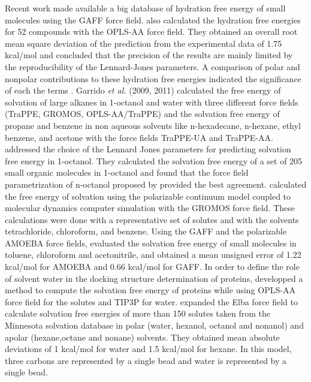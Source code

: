 Recent work \cite{PMID:24928188,mobley2017} made available a big database of hydration free energy of small molecules using the GAFF force field.  also calculated the hydration free energies for 52 compounds with the OPLS-AA force field. They obtained an overall root mean square deviation of the prediction from the experimental data of 1.75 kcal/mol and concluded that the precision of the results are mainly limited by the reproducibility of the Lennard-Jones parameters. A comparison of polar and nonpolar contributions to these hydration free energies indicated the significance of each the terms  \cite{izairi2017}. Garrido \textit{et al.} (2009, 2011) calculated the free energy of solvation of large alkanes in 1-octanol and water with three different force fields (TraPPE, GROMOS, OPLS-AA/TraPPE) and the solvation free energy of propane and benzene in non aqueous solvents like n-hexadecane, n-hexane, ethyl benzene, and acetone  with the force fields TraPPE-UA and TraPPE-AA.  addressed the choice of the Lennard Jones parameters for predicting solvation free energy in 1-octanol. They calculated the solvation free energy of a set of 205 small organic molecules in 1-octanol and found that the force field parametrization of n-octanol proposed by  provided the best agreement.  calculated the free energy of solvation using the polarizable continuum model coupled to molecular dynamics computer simulation with the GROMOS force field. These calculations were done with a representative set of solutes and with the solvents tetrachloride, chloroform, and benzene. Using the GAFF and the polarizable AMOEBA force fields,  evaluated the solvation free energy of small molecules in toluene, chloroform and acetonitrile, and obtained a mean unsigned error of 1.22 kcal/mol for AMOEBA and 0.66 kcal/mol for GAFF. In order to define the role of solvent water in the docking structure determination of proteins,  developped a method to compute the solvation free energy of proteins while using OPLS-AA force field for the
solutes and TIP3P for water.  expanded the Elba force field to calculate solvation free energies of more than 150 solutes taken from the Minnesota solvation
database in polar (water, hexanol, octanol and nonanol) and apolar (hexane,octane and nonane) solvents. They obtained mean absolute deviations of 1 kcal/mol for water and 1.5 kcal/mol for hexane. In this model, three carbons are represented by a single bead and water is represented by a single bead. 

